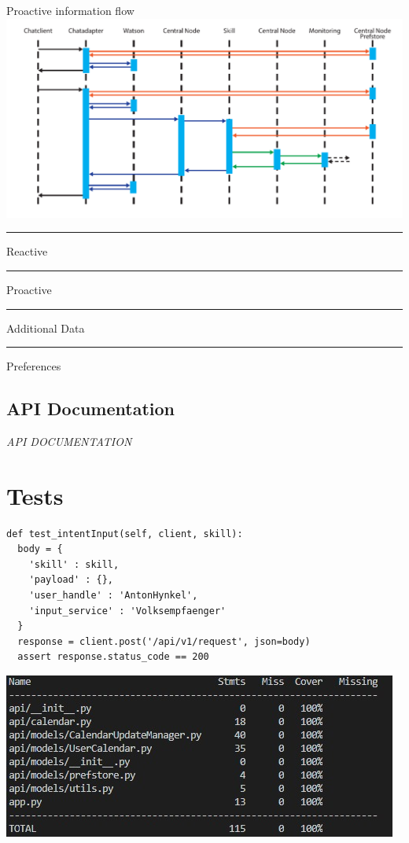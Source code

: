 \documentclass[10pt]{beamer}
\newcommand\crule[3][black]{\textcolor{#1}{\rule{#2}{#3}}}
\begin{document}
\begin{frame}{Proactive information flow}
  \includegraphics[width=\textwidth,page=2]{ProcessFlows}
  
  \crule[aswe-reactive]{0.2cm}{0.2cm} Reactive \hspace{0.3cm}
  \crule[aswe-proactive]{0.2cm}{0.2cm} Proactive \hspace{0.3cm}
  \crule[aswe-data]{0.2cm}{0.2cm} Additional Data \hspace{0.3cm}
  \crule[aswe-preferences]{0.2cm}{0.2cm} Preferences
\end{frame}

\subsection{API Documentation}

\begin{frame}
  \begin{center}
    \Large \textit{API DOCUMENTATION}
  \end{center}
\end{frame}

\section{Tests}

\begin{frame}[fragile]
  \begin{lstlisting}
def test_intentInput(self, client, skill):
  body = {
    'skill' : skill,
    'payload' : {},
    'user_handle' : 'AntonHynkel',
    'input_service' : 'Volksempfaenger'
  }
  response = client.post('/api/v1/request', json=body)
  assert response.status_code == 200
  \end{lstlisting}
  \includegraphics[width=\textwidth]{CodeCoverage}
\end{frame}
\end{document}
